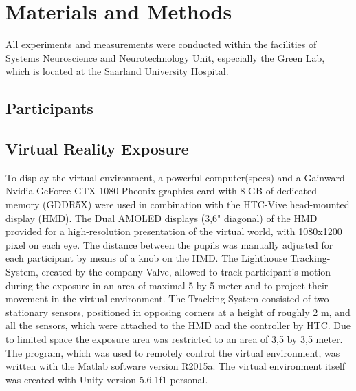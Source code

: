 
\section{Materials and Methods}
All experiments and measurements were conducted within the facilities of Systems Neuroscience and Neurotechnology Unit, especially the Green Lab, which is located at the Saarland University Hospital. 

\subsection{Participants}


\subsection{Virtual Reality Exposure}
To display the virtual environment, a powerful computer(specs) and a Gainward Nvidia GeForce GTX 1080 Pheonix graphics card with 8 GB of dedicated memory (GDDR5X) were used in combination with the HTC-Vive head-mounted display (HMD). The Dual AMOLED displays (3,6" diagonal) of the HMD provided for a high-resolution presentation of the virtual world,  with 1080x1200 pixel on each eye. The distance between the pupils was manually adjusted for each participant by means of a knob on the HMD. The Lighthouse Tracking-System, created by the company Valve, allowed to track participant's motion during the exposure in an area of maximal 5 by 5 meter and to project their movement in the virtual environment. The Tracking-System consisted of two stationary sensors, positioned in opposing corners at a height of roughly 2 m, and all the sensors, which were attached to the HMD and the controller by HTC. Due to limited space the exposure area was restricted to an area of 3,5 by 3,5 meter. The program, which was used to remotely control the virtual environment, was written with the Matlab software version R2015a. The virtual environment itself was created with Unity version 5.6.1f1 personal. %


